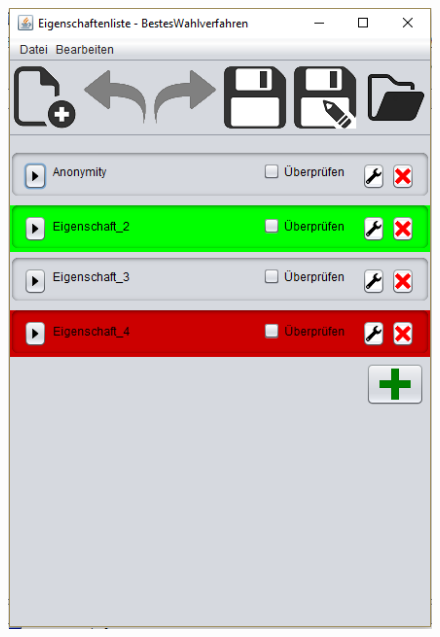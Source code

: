 \documentclass[a4paper]{scrreprt}
\begin{document}
\begin{figure}[H]
\begin{minipage}{.5\textwidth}
  \centering
  \includegraphics[scale=0.5]{nach-testen.png}
  \label{fig:sub1}
\end{minipage}
\begin{minipage}{.5\textwidth}
  \centering

\end{minipage}
\end{figure}
\end{document}
